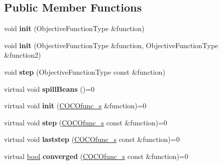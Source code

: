 \subsection*{Public Member Functions}
\begin{DoxyCompactItemize}
\item 
void {\bfseries init} (Objective\+Function\+Type \&function)\hypertarget{classCocoOptimiser_a0c7df5618e3fba607b32cf77190f49cb}{}\label{classCocoOptimiser_a0c7df5618e3fba607b32cf77190f49cb}

\item 
void {\bfseries init} (Objective\+Function\+Type \&function, Objective\+Function\+Type \&function2)\hypertarget{classCocoOptimiser_af261a238b756aeda91f891ca417ebe58}{}\label{classCocoOptimiser_af261a238b756aeda91f891ca417ebe58}

\item 
void {\bfseries step} (Objective\+Function\+Type const \&function)\hypertarget{classCocoOptimiser_ae48180f04b5b40318b4c52cd02862239}{}\label{classCocoOptimiser_ae48180f04b5b40318b4c52cd02862239}

\item 
virtual void {\bfseries spill\+Beans} ()=0\hypertarget{classCocoOptimiser_a4dbd61355e26a5e7b855b6f5af0feace}{}\label{classCocoOptimiser_a4dbd61355e26a5e7b855b6f5af0feace}

\item 
virtual void {\bfseries init} (\hyperlink{classCOCOfunc__s}{C\+O\+C\+Ofunc\+\_\+s} \&function)=0\hypertarget{classCocoOptimiser_ae4811d15c18ee9afffe7d5980088995c}{}\label{classCocoOptimiser_ae4811d15c18ee9afffe7d5980088995c}

\item 
virtual void {\bfseries step} (\hyperlink{classCOCOfunc__s}{C\+O\+C\+Ofunc\+\_\+s} const \&function)=0\hypertarget{classCocoOptimiser_aa76c97ccc59b62d69fb6b69724b3fc0e}{}\label{classCocoOptimiser_aa76c97ccc59b62d69fb6b69724b3fc0e}

\item 
virtual void {\bfseries laststep} (\hyperlink{classCOCOfunc__s}{C\+O\+C\+Ofunc\+\_\+s} const \&function)=0\hypertarget{classCocoOptimiser_a0a93b995e6ffc78202d9aca8d5f3eb4d}{}\label{classCocoOptimiser_a0a93b995e6ffc78202d9aca8d5f3eb4d}

\item 
virtual \hyperlink{classbool}{bool} {\bfseries converged} (\hyperlink{classCOCOfunc__s}{C\+O\+C\+Ofunc\+\_\+s} const \&function)=0\hypertarget{classCocoOptimiser_a771e70ed289bc039edf20c875aacbbb4}{}\label{classCocoOptimiser_a771e70ed289bc039edf20c875aacbbb4}


\end{DoxyCompactItemize}
